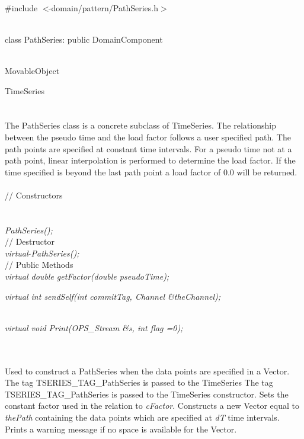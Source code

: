 
   \\
\#include $<\tilde{ }$domain/pattern/PathSeries.h$>$  


  \\
class PathSeries: public DomainComponent  


 \\
MovableObject 

\indent\indent TimeSeries \\
\indent\indent{} \\

 \\ 
\indent The PathSeries class is a concrete subclass of TimeSeries.
The relationship between the pseudo time and the load factor follows
a user specified path. The path points are specified at constant time
intervals. For a pseudo time not at a path point, linear interpolation
is performed to determine the load factor. If the time specified is
beyond the last path point a load factor of $0.0$ will be returned.\\

 \\
\indent // Constructors \\ 
\\ 
\\ 
{\em PathSeries();}\\ 

\indent // Destructor \\ 
{\em virtual $\tilde{ }$PathSeries();}\\  

\indent // Public Methods \\ 
{\em  virtual double getFactor(double pseudoTime);}

{\em  virtual int sendSelf(int commitTag, Channel \&theChannel);}

\\
{\em  virtual void Print(OPS_Stream \&s, int flag =0);}


 \\ 
\\ 
Used to construct a PathSeries when the data points are specified in a
Vector. The tag TSERIES\_TAG\_PathSeries is passed to the TimeSeries
The tag TSERIES\_TAG\_PathSeries is passed to the TimeSeries
constructor. Sets the constant factor used in the relation to {\em
cFactor}. Constructs a new Vector equal to {\em thePath} containing the
data points which are specified at {\em dT} time intervals. Prints a
warning message if no space is available for the Vector.\\

